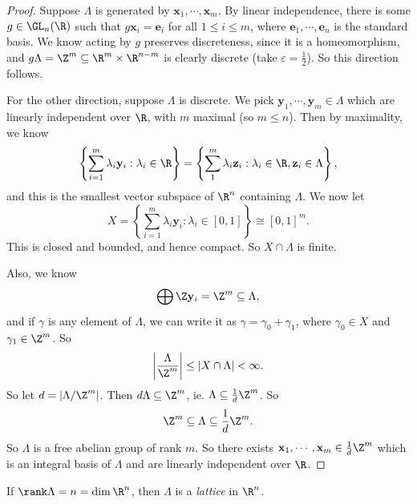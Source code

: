 \documentclass[a4paper]{article}
\begin{document}
\begin{proof}
  Suppose $\Lambda$ is generated by $\mathbf{x}_1, \cdots, \mathbf{x}_m$. By linear independence, there is some $g \in \GL_n(\R)$ such that $g \mathbf{x}_i = \mathbf{e}_i$ for all $1 \leq i \leq m$, where $\mathbf{e}_1, \cdots, \mathbf{e}_n$ is the standard basis. We know acting by $g$ preserves discreteness, since it is a homeomorphism, and $g\Lambda = \Z^m \subseteq \R^m \times \R^{n - m}$ is clearly discrete (take $\varepsilon = \frac{1}{2}$). So this direction follows.

  For the other direction, suppose $\Lambda$ is discrete. We pick $\mathbf{y}_1, \cdots, \mathbf{y}_m \in \Lambda$ which are linearly independent over $\R$, with $m$ maximal (so $m \leq n$). Then by maximality, we know
  \[
    \left\{\sum_{i = 1}^m \lambda_i \mathbf{y}_i: \lambda_i \in \R\right\} = \left\{ \sum_1^m \lambda_i \mathbf{z}_i: \lambda_i \in \R, \mathbf{z}_i \in \Lambda\right\},
  \]
  and this is the smallest vector subspace of $\R^n$ containing $\Lambda$. We now let
  \[
    X = \left\{\sum_{i = 1}^m \lambda_i \mathbf{y}_i: \lambda_i \in [0, 1]\right\} \cong [0, 1]^m.
  \]
  This is closed and bounded, and hence compact. So $X \cap \Lambda$ is finite.

  Also, we know
  \[
    \bigoplus \Z \mathbf{y}_i = \Z^m \subseteq \Lambda,
  \]
  and if $\gamma$ is any element of $\Lambda$, we can write it as $\gamma = \gamma_0 + \gamma_1$, where $\gamma_0 \in X$ and $\gamma_1 \in \Z^m$. So
  \[
    \left|\frac{\Lambda}{\Z^m}\right| \leq |X \cap \Lambda| < \infty.
  \]
  So let $d = |\Lambda/\Z^m|$. Then $d \Lambda \subseteq \Z^m$, ie. $\Lambda \subseteq \frac{1}{d} \Z^m$. So
  \[
    \Z^m \subseteq \Lambda \subseteq \frac{1}{d} \Z^m.
  \]
  So $\Lambda$ is a free abelian group of rank $m$. So there exists $\mathbf{x}_1, \cdots, \mathbf{x}_m \in \frac{1}{d}\Z^m$ which is an integral basis of $\Lambda$ and are linearly independent over $\R$.
\end{proof}

\begin{defi}[Lattice]
  If $\rank \Lambda = n = \dim \R^n$, then $\Lambda$ is a \emph{lattice} in $\R^n$.
\end{defi}
\end{document}
